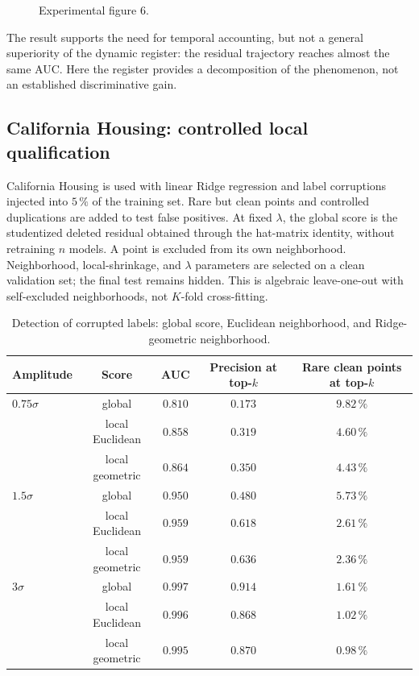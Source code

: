 \begin{figure}[htbp]
\centering{}
\caption{Experimental figure 6.}\label{fig:stagewise}
\end{figure}

The result supports the need for temporal accounting, but not a general superiority of the dynamic register: the residual trajectory reaches almost the same AUC. Here the register provides a decomposition of the phenomenon, not an established discriminative gain.

\subsection{California Housing: controlled local qualification}
\label{subsec:california}
California Housing is used with linear Ridge regression and label corruptions injected into $5\,\%$ of the training set. Rare but clean points and controlled duplications are added to test false positives. At fixed $\lambda$, the global score is the studentized deleted residual obtained through the hat-matrix identity, without retraining $n$ models. A point is excluded from its own neighborhood. Neighborhood, local-shrinkage, and $\lambda$ parameters are selected on a clean validation set; the final test remains hidden. This is algebraic leave-one-out with self-excluded neighborhoods, not $K$-fold cross-fitting.

\begin{table}[H]
\centering
\caption{Detection of corrupted labels: global score, Euclidean neighborhood, and Ridge-geometric neighborhood.}
\label{tab:california}
\scriptsize
\begin{tabular}{@{}lcccc@{}}
\toprule
Amplitude & Score & AUC & Precision at top-$k$ & Rare clean points at top-$k$ \\
\midrule
$0.75\sigma$ & global & $0.810$ & $0.173$ & $9.82\,\%$ \\
                & local Euclidean & $0.858$ & $0.319$ & $4.60\,\%$ \\
                & local geometric & $0.864$ & $0.350$ & $4.43\,\%$ \\
$1.5\sigma$  & global & $0.950$ & $0.480$ & $5.73\,\%$ \\
                & local Euclidean & $0.959$ & $0.618$ & $2.61\,\%$ \\
                & local geometric & $0.959$ & $0.636$ & $2.36\,\%$ \\
$3\sigma$      & global & $0.997$ & $0.914$ & $1.61\,\%$ \\
                & local Euclidean & $0.996$ & $0.868$ & $1.02\,\%$ \\
                & local geometric & $0.995$ & $0.870$ & $0.98\,\%$ \\
\bottomrule
\end{tabular}
\end{table}

